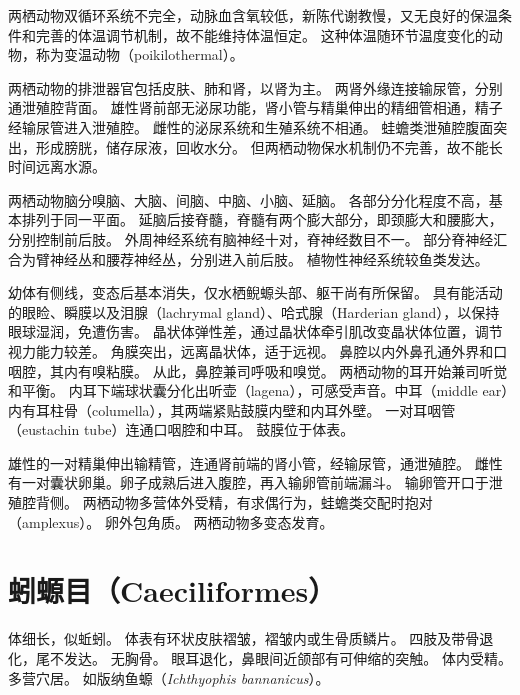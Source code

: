 \documentclass[11pt]{article}
\begin{document}
\newline

两栖动物双循环系统不完全，动脉血含氧较低，新陈代谢教慢，又无良好的保温条件和完善的体温调节机制，故不能维持体温恒定。
这种体温随环节温度变化的动物，称为变温动物（poikilothermal）。

\newline

两栖动物的排泄器官包括皮肤、肺和肾，以肾为主。
两肾外缘连接输尿管，分别通泄殖腔背面。
雄性肾前部无泌尿功能，肾小管与精巢伸出的精细管相通，精子经输尿管进入泄殖腔。
雌性的泌尿系统和生殖系统不相通。
蛙蟾类泄殖腔腹面突出，形成膀胱，储存尿液，回收水分。
但两栖动物保水机制仍不完善，故不能长时间远离水源。

\newline

两栖动物脑分嗅脑、大脑、间脑、中脑、小脑、延脑。
各部分分化程度不高，基本排列于同一平面。
延脑后接脊髓，脊髓有两个膨大部分，即颈膨大和腰膨大，分别控制前后肢。
外周神经系统有脑神经十对，脊神经数目不一。
部分脊神经汇合为臂神经丛和腰荐神经丛，分别进入前后肢。
植物性神经系统较鱼类发达。

\newline

幼体有侧线，变态后基本消失，仅水栖鲵螈头部、躯干尚有所保留。
具有能活动的眼睑、瞬膜以及泪腺（lachrymal gland）、哈式腺（Harderian gland），以保持眼球湿润，免遭伤害。
晶状体弹性差，通过晶状体牵引肌改变晶状体位置，调节视力能力较差。
角膜突出，远离晶状体，适于远视。
鼻腔以内外鼻孔通外界和口咽腔，其内有嗅粘膜。
从此，鼻腔兼司呼吸和嗅觉。
两栖动物的耳开始兼司听觉和平衡。
内耳下端球状囊分化出听壶（lagena），可感受声音。中耳（middle ear）内有耳柱骨（columella），其两端紧贴鼓膜内壁和内耳外壁。
一对耳咽管（eustachin tube）连通口咽腔和中耳。
鼓膜位于体表。

\newline

雄性的一对精巢伸出输精管，连通肾前端的肾小管，经输尿管，通泄殖腔。
雌性有一对囊状卵巢。卵子成熟后进入腹腔，再入输卵管前端漏斗。
输卵管开口于泄殖腔背侧。
两栖动物多营体外受精，有求偶行为，蛙蟾类交配时抱对（amplexus）。
卵外包角质。
两栖动物多变态发育。

\section{蚓螈目（Caeciliformes）}
体细长，似蚯蚓。
体表有环状皮肤褶皱，褶皱内或生骨质鳞片。
四肢及带骨退化，尾不发达。
无胸骨。
眼耳退化，鼻眼间近颌部有可伸缩的突触。
体内受精。
多营穴居。
如版纳鱼螈（\textit{Ichthyophis bannanicus}）。
\end{document}
